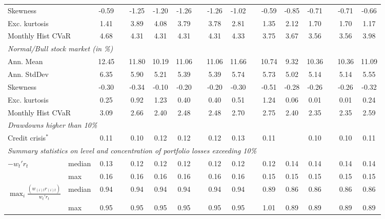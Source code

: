\documentclass[12pt,a4paper]{article}
\begin{document}
\begin{landscape}
\begin{table}[tb]
\begin{center}
{\begin{tabular}{|lc c c ccc c cc c ccc c cc| }
  \multicolumn{2}{|l}{Skewness}     &          -0.59 & & -1.25 & -1.20 & -1.26 & & -1.26& -1.02  & &  -0.59 & -0.85 & -0.71 & & -0.71& -0.66 \\
    \multicolumn{2}{|l}{Exc. kurtosis}   &     1.41 & & 3.89 & 4.08 & 3.79 & & 3.78& 2.81 & &  1.35 & 2.12 & 1.70 & & 1.70 & 1.17      \\
 \multicolumn{2}{|l}{Monthly Hist  CVaR}   &	 4.68 & & 4.31 & 4.31 & 4.31 & & 4.31& 4.33  & & 3.75 & 3.67 & 3.56 & & 3.56 & 3.98  \\
 \multicolumn{17}{|l|}{\emph{Normal/Bull stock market (in \%)}} \\
 \multicolumn{2}{|l}{Ann. Mean  } 	     &   12.45 & & 11.80 & 10.19 & 11.06 & & 11.06& 11.66    & &   10.74 & 9.32 & 10.36 &  & 10.36& 11.09  \\
 \multicolumn{2}{|l}{Ann. StdDev }       &   6.35 & & 5.90 & 5.21 & 5.39 & & 5.39& 5.74  &&   5.73 & 5.02 & 5.14 &  & 5.14& 5.55\\
  \multicolumn{2}{|l}{Skewness }       &     -0.30 & & -0.34 & -0.10 & -0.20 &  & -0.20& -0.30&&   -0.51 & -0.28 & -0.26 & & -0.26  & -0.32  \\
    \multicolumn{2}{|l}{Exc. kurtosis }   &     0.25 & & 0.92 & 1.23 & 0.40 & & 0.40& 0.51      & &  1.24 & 0.06 & 0.01 & & 0.01 &0.24  \\
 \multicolumn{2}{|l}{Monthly Hist  CVaR}   &  3.09 & & 2.66 & 2.40 & 2.48 & & 2.48& 2.70 & &  2.75 & 2.40 & 2.35 & & 2.35& 2.59  \\
 \hline \multicolumn{17}{|l|}{ \emph{Drawdowns higher than 10\%}  }  \\
 \multicolumn{2}{|l}{Credit crisis$^{*}$}       &  0.11 &  & 0.10 & 0.12 & 0.12 & & 0.12 & 0.13& &  0.11 &  & 0.10 & & 0.10 &  0.11  \\
 \hline \multicolumn{17}{|l|}{ \emph{Summary statistics on level and concentration of portfolio losses exceeding 10\%}  }  \\
$-w_t'r_t$ & \multicolumn{1}{l}{ median}   &
  0.13 & & 0.12 & 0.12 & 0.12 & & 0.12 & 0.12 & & 0.12 & 0.14 & 0.14 & & 0.14 & 0.14     \\
 &\multicolumn{1}{l}{  max  }    &
  0.16 & & 0.16 & 0.16 & 0.16 & & 0.16 & 0.16  & &  0.15 & 0.15 & 0.15 & & 0.15 & 0.15        \\
$\max_i\frac{(w_{(i)t}r_{(i)t})}{w_t'r_t}$  & \multicolumn{1}{l}{ median}   &
0.94 & & 0.94 & 0.94 & 0.94 & & 0.94 & 0.94 & & 0.89 & 0.86 & 0.86 & & 0.86 & 0.86 \\
         & \multicolumn{1}{l}{ max  }    &
 0.95 & &0.95 & 0.95 & 0.95 & & 0.95 & 0.95 & &  1.01 & 0.89 & 0.89 & & 0.89 & 0.89 \\  \hline
\end{tabular}
}
\end{center}




\end{table}
\end{landscape}
\end{document}
